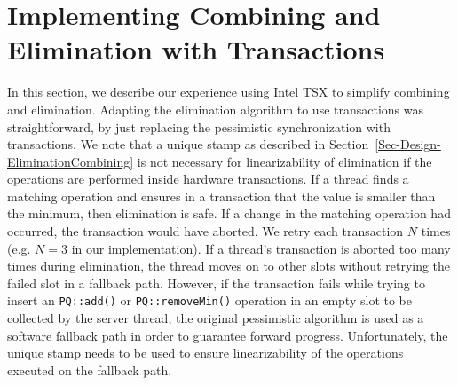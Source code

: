 \section{Implementing Combining and Elimination with Transactions}
\label{App-Transactions-Delegation}

In this section, we describe our experience using Intel TSX to simplify combining and elimination. Adapting the elimination algorithm to use transactions was straightforward, by just replacing the pessimistic synchronization with transactions. We note that a unique stamp as described in Section~\ref{Sec-Design-EliminationCombining} is not necessary for linearizability of elimination if the operations are performed inside hardware transactions. If a thread finds a matching operation and ensures in a transaction that the value is smaller than the minimum, then elimination is safe. If a change in the matching operation had occurred, the transaction would have aborted. We retry each transaction $N$ times (e.g. $N=3$ in our implementation). If a thread's transaction is aborted too many times during elimination, the thread moves on to other slots without retrying the failed slot in a fallback path. However, if the transaction fails while trying to insert an \texttt{PQ::add()} or \texttt{PQ::removeMin()} operation in an empty slot to be collected by the server thread, the original pessimistic algorithm is used as a software fallback path in order to guarantee forward progress. Unfortunately, the unique stamp needs to be used to ensure linearizability of the operations executed on the fallback path. 

